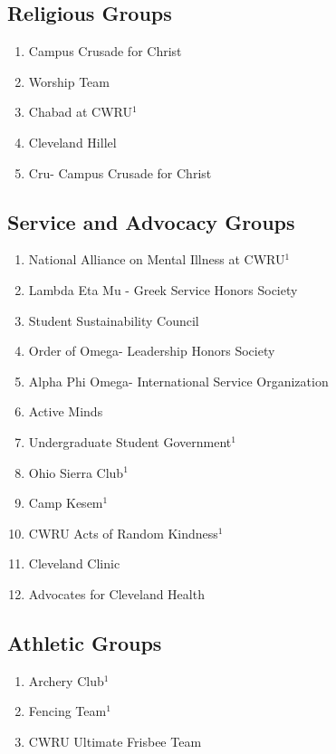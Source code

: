     \subsection*{Religious Groups}
      \begin{enumerate}
       \item Campus Crusade for Christ  
       \item Worship Team
       \item Chabad at CWRU$^1$
       \item Cleveland Hillel
       \item Cru- Campus Crusade for Christ
      \end{enumerate}
      
    \subsection*{Service and Advocacy Groups}
      \begin{enumerate}
	\item National Alliance on Mental Illness at CWRU$^1$
	\item Lambda Eta Mu - Greek Service Honors Society
	\item Student Sustainability Council
	\item Order of Omega- Leadership Honors Society
	\item Alpha Phi Omega- International Service Organization
	\item Active Minds
	\item Undergraduate Student Government$^1$
	\item Ohio Sierra Club$^1$
	\item Camp Kesem$^1$
	\item CWRU Acts of Random Kindness$^1$
	\item Cleveland Clinic
	\item Advocates for Cleveland Health
      \end{enumerate}
      
    \subsection*{Athletic Groups}
      \begin{enumerate}
       \item Archery Club$^1$
       \item Fencing Team$^1$
       \item CWRU Ultimate Frisbee Team
      \end{enumerate}
      
